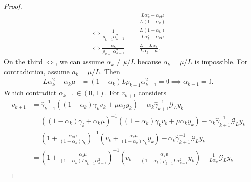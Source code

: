 \documentclass[12pt]{article}
\begin{document}
\begin{proof}
\begin{align*}
                &= 
                \frac{L \alpha_k^2 - \alpha_k\mu}{L (1 - \alpha_k)}
                \\
                \iff 
                \frac{1}{\rho_{k - 1}\alpha_{k - 1}^2}
                &= 
                \frac{L (1 - \alpha_k)}{L \alpha_k^2 - \alpha_k\mu}
                \\
                \iff 
                \frac{\alpha_k}{\rho_{k - 1}\alpha_{k - 1}^2}
                &= 
                \frac{L - L\alpha_k}{L\alpha_k - \mu}. 
            \end{align*}
            On the third $\iff$, we can assume $\alpha_k \neq \mu/L$ because $\alpha_k = \mu/L$ is impossible. 
            For contradiction, assume $a_k = \mu/L$. 
            Then
            \begin{align*}
                L \alpha_k^2 - \alpha_k\mu &= 
                (1 - \alpha_k)L \rho_{k - 1}\alpha_{k - 1}^2 = 0 \implies \alpha_{k - 1} = 0. 
            \end{align*}
            Which contradict $\alpha_{k - 1} \in (0, 1)$. 
            For $v_{k + 1}$ considers 
            \begin{align*}
                v_{k + 1} &= 
                \hat \gamma_{k + 1}^{-1}
                ((1 - \alpha_k)\gamma_k v_k + \mu\alpha_k y_k)
                - \alpha_k\hat \gamma_{k + 1}^{-1}\mathcal G_L y_k
                \\
                &= 
                ((1 - \alpha_k)\gamma_k + \alpha_k \mu)^{-1}
                \left(
                    (1 - \alpha_k)\gamma_k v_k + \mu\alpha_k y_k
                \right)
                - \alpha_k\hat \gamma_{k + 1}^{-1}\mathcal G_L y_k
                \\
                &= 
                \left(
                    1 + \frac{\alpha_k\mu}{(1 - \alpha_k)\gamma_k}
                \right)^{-1}
                \left(
                    v_k + 
                    \frac{\alpha_k\mu}{(1 - \alpha_k)\gamma_k} y_k
                \right)
                - \alpha_k\hat \gamma_{k + 1}^{-1}\mathcal G_L y_k
                \\
                &= 
                \left(
                    1 + \frac{\alpha_k\mu}{(1 -\alpha_k)L\rho_{k - 1}\alpha_{k - 1}^2}
                \right)^{-1}
                \left(
                    v_k + 
                    \frac{\alpha_k\mu}{(1 - \alpha_k)\rho_{k - 1}L\alpha_{k - 1}^2} y_k
                \right)
                - \frac{1}{L\alpha_{k}}\mathcal G_L y_k
                \\

\end{align*}
\end{proof}
\end{document}
